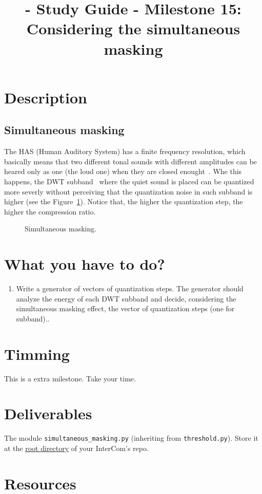 
\title{\TM{} - Study Guide - Milestone 15: Considering the simultaneous masking}

\maketitle

\section{Description}

\subsection{Simultaneous masking}
The HAS (Human Auditory System) has a finite frequency resolution,
which basically means that two different tonal sounds with different
amplitudes can be heared only as one (the loud one) when they are
closed enought~\cite{bosi2003intro}. Whe this happens, the DWT
subband~\cite{vetterli1995wavelets} where the quiet sound is placed
can be quantized more severly without perceiving that the quantization
noise in such subband is higher (see the Figure~\ref{fig:SM}). Notice
that, the higher the quantization step, the higher the compression
ratio.

\begin{figure}
  \centering
  \caption{Simultaneous masking.}
  \label{fig:SM}
\end{figure}


\section{What you have to do?}

\begin{enumerate}
\item Write a generator of vectors of quantization steps. The
  generator should analyze the energy of each DWT subband and decide,
  considering the simultaneous masking effect, the vector of
  quantization steps (one for subband)..
\end{enumerate}

\section{Timming}

This is a extra milestone. Take your time.

\section{Deliverables}

The module \verb|simultaneous_masking.py| (inheriting from
\verb|threshold.py|). Store it at the
\href{https://github.com/Tecnologias-multimedia/intercom}{root
  directory} of your InterCom's repo.

\section{Resources}



